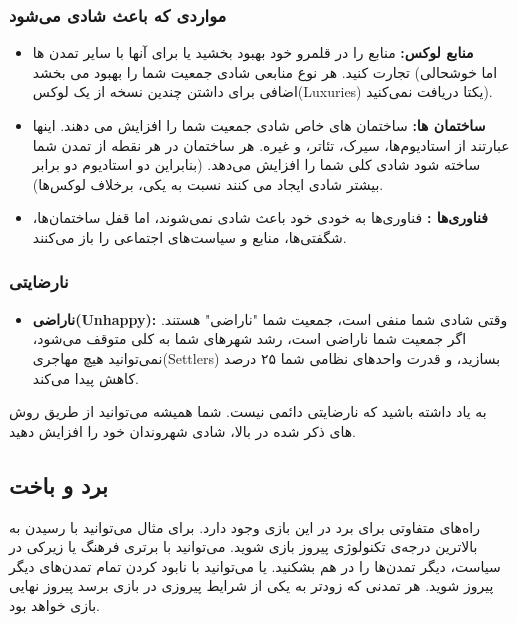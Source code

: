 \documentclass[]{article}
\begin{document}
\subsubsection*{{\titr مواردی که باعث شادی می‌شود}}
\begin{itemize}
	\item \textbf{منابع لوکس:} منابع را در قلمرو خود بهبود بخشید یا برای آنها با سایر تمدن ها تجارت کنید. هر نوع منابعی شادی جمعیت شما را بهبود می بخشد (اما خوشحالی اضافی برای داشتن چندین نسخه از یک لوکس(Luxuries) یکتا دریافت نمی‌کنید).
	\item \textbf{ساختمان ها:} ساختمان های خاص شادی جمعیت شما را افزایش می دهند. اینها عبارتند از استادیوم‌ها، سیرک، تئاتر، و غیره. هر ساختمان در هر نقطه از تمدن شما ساخته شود شادی کلی شما را افزایش می‌دهد. (بنابراین دو استادیوم دو برابر بیشتر شادی ایجاد می کنند نسبت به یکی، برخلاف لوکس‌ها).
	\item \textbf{فناوری‌ها :} فناوری‌ها به خودی خود باعث شادی نمی‌شوند، اما قفل ساختمان‌ها، شگفتی‌ها، منابع و سیاست‌های اجتماعی را باز می‌کنند.
\end{itemize}
\subsubsection*{{\titr نارضایتی}}
\begin{itemize}
	\item \textbf{ناراضی(Unhappy):} وقتی شادی شما منفی است، جمعیت شما "ناراضی" هستند. اگر جمعیت شما ناراضی است، رشد شهرهای شما به کلی متوقف می‌شود، نمی‌توانید هیچ مهاجری(Settlers) بسازید، و قدرت واحدهای نظامی شما ۲۵ درصد کاهش پیدا می‌کند.
\end{itemize}
به یاد داشته باشید که نارضایتی دائمی نیست. شما همیشه می‌توانید از طریق روش های ذکر شده در بالا، شادی شهروندان خود را افزایش دهید.
\subsection*{{\titr برد و باخت}}
راه‌های متفاوتی برای برد در این بازی وجود دارد. برای مثال می‌توانید با رسیدن به بالاترین درجه‌ی تکنولوژی پیروز بازی شوید. می‌توانید با برتری فرهنگ یا زیرکی در سیاست، دیگر تمدن‌ها را در هم بشکنید. یا می‌توانید با نابود کردن تمام تمدن‌های دیگر پیروز شوید. هر تمدنی که زودتر به یکی از شرایط پیروزی در بازی برسد پیروز نهایی بازی خواهد بود.
\end{document}
